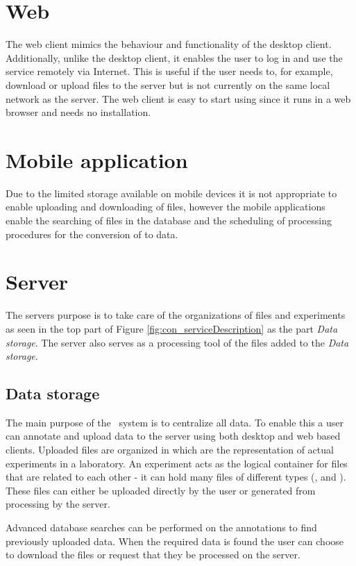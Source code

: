 \section{Web}
The web client mimics the behaviour and functionality of the desktop client. Additionally, unlike the desktop client, it enables the user to log in and use the service remotely via Internet. This is useful if the user needs to, for example, download or upload files to the server but is not currently on the same local network as the server. The web client is easy to start using since it runs in a web browser and needs no installation.


\section{Mobile application}
Due to the limited storage available on mobile devices it is not appropriate to enable uploading and downloading of files, however the mobile applications enable the searching of files in the database and the scheduling of processing procedures for the conversion of  to  data.

\section{Server}
The servers purpose is to take care of the organizations of files and experiments as seen in the top part of Figure \ref{fig:con_serviceDescription} as the part \textit{Data storage}. The server also serves as a processing tool of the files added to the \textit{Data storage}. 

\subsection{Data storage}
The main purpose of the \appName\ system is to centralize all data. To enable this a user can annotate and upload data to the server using both desktop and web based clients. Uploaded files are organized in  which are the representation of actual experiments in a laboratory. An experiment acts as the logical container for files that are related to each other - it can hold many files of different types (,  and ). These files can either be uploaded directly by the user or generated from processing by the server.

Advanced database searches can be performed on the annotations to find previously uploaded data. When the required data is found the user can choose to download the files or request that they be processed on the server. 



